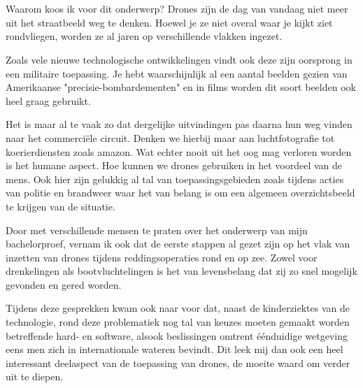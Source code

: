 
\chapter*{}
\label{ch:voorwoord}

Waarom koos ik voor dit onderwerp? Drones zijn de dag van vandaag niet meer uit het straatbeeld weg te denken. Hoewel je ze niet overal waar je kijkt ziet rondvliegen, worden ze al jaren op verschillende vlakken ingezet.

Zoals vele nieuwe technologische ontwikkelingen vindt ook deze zijn oorsprong in een militaire toepassing. Je hebt waarschijnlijk al een aantal beelden gezien van Amerikaanse "precisie-bombardementen" en in films worden dit soort beelden ook heel graag gebruikt.

Het is maar al te vaak zo dat dergelijke uitvindingen pas daarna hun weg vinden naar het commerciële circuit. Denken we hierbij maar aan luchtfotografie tot koerierdiensten zoals amazon. Wat echter nooit uit het oog mag verloren worden is het humane aspect. Hoe kunnen we drones gebruiken in het voordeel van de mens. Ook hier zijn gelukkig al tal van toepassingsgebieden zoals tijdens acties van politie en brandweer waar het van belang is om een algemeen overzichtsbeeld te krijgen van de situatie.

Door met verschillende mensen te praten over het onderwerp van mijn bachelorproef, vernam ik ook dat de eerste stappen al gezet zijn op het vlak van inzetten van drones tijdens reddingsoperaties rond en op zee. Zowel voor drenkelingen als bootvluchtelingen is het van levensbelang dat zij zo snel mogelijk gevonden en gered worden. 

Tijdens deze gesprekken kwam ook naar voor dat, naast de kinderziektes van de technologie, rond deze problematiek nog tal van keuzes moeten gemaakt worden betreffende hard- en software, alsook beslissingen omtrent éénduidige wetgeving eens men zich in internationale wateren bevindt. 
Dit leek mij dan ook een heel interessant deelaspect van de toepassing van drones, de moeite waard om verder uit te diepen. 

